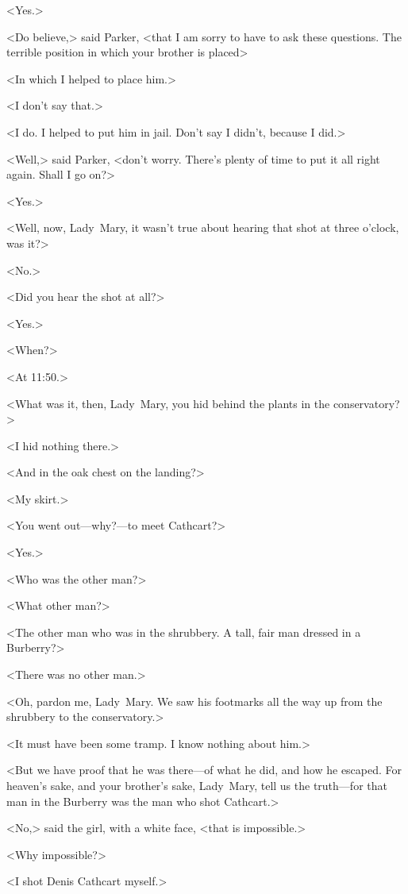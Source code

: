 <Yes.>

<Do believe,> said Parker, <that I am sorry to have to ask these questions. The terrible position in which your brother is placed\longdash>

<In which I helped to place him.>

<I don't say that.>

<I do. I helped to put him in jail. Don't say I didn't, because I did.>

<Well,> said Parker, <don't worry. There's plenty of time to put it all right again. Shall I go on?>

<Yes.>

<Well, now, Lady~Mary, it wasn't true about hearing that shot at three o'clock, was it?>

<No.>

<Did you hear the shot at all?>

<Yes.>

<When?>

<At 11:50.>

<What was it, then, Lady~Mary, you hid behind the plants in the conservatory?>

<I hid nothing there.>

<And in the oak chest on the landing?>

<My skirt.>

<You went out—why?—to meet Cathcart?>

<Yes.>

<Who was the other man?>

<What other man?>

<The other man who was in the shrubbery. A tall, fair man dressed in a Burberry?>

<There was no other man.>

<Oh, pardon me, Lady~Mary. We saw his footmarks all the way up from the shrubbery to the conservatory.>

<It must have been some tramp. I know nothing about him.>

<But we have proof that he was there—of what he did, and how he escaped. For heaven's sake, and your brother's sake, Lady~Mary, tell us the truth—for that man in the Burberry was the man who shot Cathcart.>

<No,> said the girl, with a white face, <that is impossible.>

<Why impossible?>

<I shot Denis Cathcart myself.>

\divider


